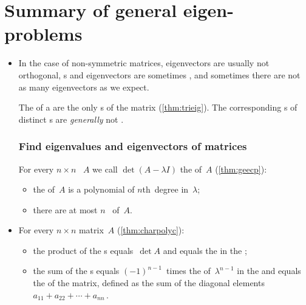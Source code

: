 
\section{Summary of general eigen-problems}
\label{sec:sumevg}

\begin{itemize}
\def\index#1{}%

\item In the case of non-symmetric matrices, eigenvectors are usually not orthogonal, s and eigenvectors are sometimes , and sometimes there are not as many eigenvectors as we expect.

\itemme The  of a  are the only s of the matrix (\cref{thm:trieig}).  
The corresponding s of distinct s are \emph{generally} not .





\subsubsection*{Find eigenvalues and eigenvectors of matrices}

\itemme For every \(n\times n\) ~\(A\) we call \(\det(A-\lambda I)\) the  of~\(A\) (\cref{thm:geecp}):
\begin{itemize}
\item the  of~\(A\) is a polynomial of \(n\)th~degree in~\(\lambda\);
\item  there are at most \(n\)~ of~\(A\).
\end{itemize}

\item For every \(n\times n\) matrix~\(A\) (\cref{thm:charpolyc}): \begin{itemize}
\item the product of the s equals~\(\det A\) and equals the  in the ;  
\item the sum of the s equals \((-1)^{n-1}\)~times the  of~\(\lambda^{n-1}\) in the  and equals the  of the matrix, defined as the sum of the diagonal elements \(a_{11}+a_{22}+\cdots+a_{nn}\)\,.
\end{itemize}


\end{itemize}
